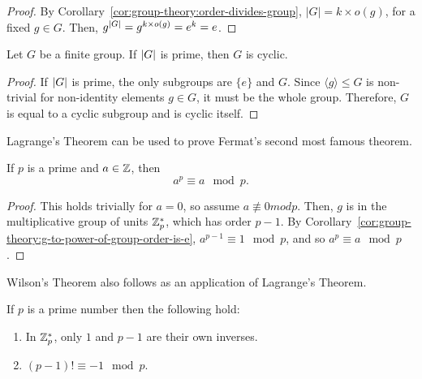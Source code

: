 \begin{proof}
  By Corollary~\ref{cor:group-theory:order-divides-group}, \(|G| = k \times o(g)\), for a fixed \(g \in G\).
  Then, \(g^{\abs{G}} = g^{k \times o(g)} = e^{k} = e\).
\end{proof}

\begin{corollary}
  Let \(G\) be a finite group.
  If \(\abs{G}\) is prime, then \(G\) is cyclic.
\end{corollary}

\begin{proof}
  If \(\abs{G}\) is prime, the only subgroups are \(\{e\}\) and \(G\).
  Since \(\langle g \rangle \leq G\) is non-trivial for non-identity elements \(g \in G\), it must be the whole group.
  Therefore, \(G\) is equal to a cyclic subgroup and is cyclic itself.
\end{proof}


Lagrange's Theorem can be used to prove Fermat's second most famous theorem.

\begin{theorem}
 \label{thm:group-theory:fermats-little-theorem}
 If \(p\) is a prime and \(a \in \mathbb{Z}\), then
 \[a^{p} \equiv a \mod p.\]
\end{theorem}

\begin{proof}
  This holds trivially for \(a = 0\), so assume \(a \not\equiv 0 mod p\).
  Then, \(g\) is in the multiplicative group of units \(\mathbb{Z}^{*}_{p}\), which has order \(p-1\). By Corollary~\ref{cor:group-theory:g-to-power-of-group-order-is-e}, \(a^{p-1} \equiv 1 \mod p\), and so \(a^{p} \equiv a \mod p\).
\end{proof}

Wilson's Theorem also follows as an application of Lagrange's Theorem.

\begin{theorem}
  \label{thm:group-theory:wilsons-theorem}
  If \(p\) is a prime number then the following hold:
  \begin{enumerate}
  \item
    In \(\mathbb{Z}^{*}_{p}\), only \(1\) and \(p-1\) are their own inverses.
  \item
    \((p - 1)! \equiv -1 \mod p\).
  \end{enumerate}
\end{theorem}

